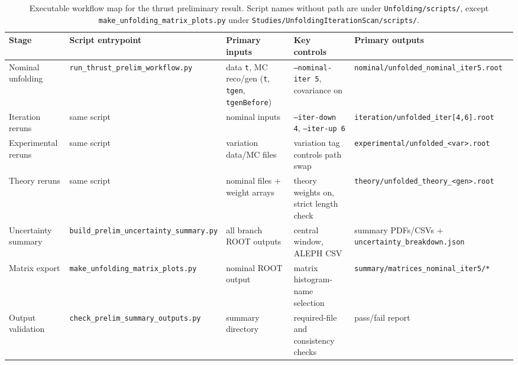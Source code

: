 \begin{table}[t!]
\centering
\scriptsize
\begin{tabular}{p{}p{}p{}p{}p{}}
\hline
Stage & Script entrypoint & Primary inputs & Key controls & Primary outputs \\
\hline
Nominal unfolding & \texttt{run\_thrust\_prelim\_workflow.py} & data \texttt{t}, MC reco/gen (\texttt{t}, \texttt{tgen}, \texttt{tgenBefore}) & \texttt{--nominal-iter 5}, covariance on & \texttt{nominal/unfolded\_nominal\_iter5.root} \\
Iteration reruns & same script & nominal inputs & \texttt{--iter-down 4}, \texttt{--iter-up 6} & \texttt{iteration/unfolded\_iter[4,6].root} \\
Experimental reruns & same script & variation data/MC files & variation tag controls path swap & \texttt{experimental/unfolded\_<var>.root} \\
Theory reruns & same script & nominal files + weight arrays & theory weights on, strict length check & \texttt{theory/unfolded\_theory\_<gen>.root} \\
Uncertainty summary & \texttt{build\_prelim\_uncertainty\_summary.py} & all branch ROOT outputs & central window, ALEPH CSV & summary PDFs/CSVs + \texttt{uncertainty\_breakdown.json} \\
Matrix export & \texttt{make\_unfolding\_matrix\_plots.py} & nominal ROOT output & matrix histogram-name selection & \texttt{summary/matrices\_nominal\_iter5/*} \\
Output validation & \texttt{check\_prelim\_summary\_outputs.py} & summary directory & required-file and consistency checks & pass/fail report \\
\hline
\end{tabular}
\normalsize
\caption{Executable workflow map for the thrust preliminary result. Script names without path are under \texttt{Unfolding/scripts/}, except \texttt{make\_unfolding\_matrix\_plots.py} under \texttt{Studies/UnfoldingIterationScan/scripts/}.}
\label{tab:workflow_map}
\end{table}

